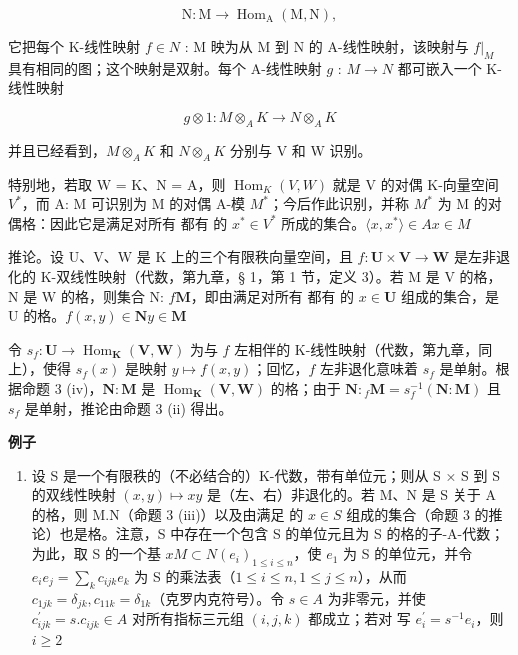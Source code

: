 \[
\mathrm{N}: \mathrm{M} \rightarrow \operatorname{Hom} _ {\mathrm{A}} (\mathrm{M}, \mathrm{N}),
\]

它把每个 K-线性映射 \(f \in N\) : M 映为从 M 到 N 的 A-线性映射，该映射与 \(f|_{M}\) 具有相同的图；这个映射是双射。每个 A-线性映射 \(g\) : \(M \to N\) 都可嵌入一个 K-线性映射

\[
g \otimes 1: M \otimes_ {A} K \rightarrow N \otimes_ {A} K
\]

并且已经看到，\(M \otimes_{A} K\) 和 \(N \otimes_{A} K\) 分别与 V 和 W 识别。

特别地，若取 W = K、N = A，则 \(\operatorname{Hom}_{K}(V, W)\) 就是 V 的对偶 K-向量空间 \(V^{*}\)，而 A: M 可识别为 M 的对偶 A-模 \(M^{*}\)；今后作此识别，并称 \(M^{*}\) 为 M 的对偶格：因此它是满足对所有  都有  的 \(x^{*} \in V^{*}\) 所成的集合。\(\langle x, x^{*} \rangle \in A\)\(x \in M\)

推论。设 U、V、W 是 K 上的三个有限秩向量空间，且 \(f: \mathbf{U} \times \mathbf{V} \to \mathbf{W}\) 是左非退化的 K-双线性映射（代数，第九章，§ 1，第 1 节，定义 3）。若 M 是 V 的格，N 是 W 的格，则集合 N: \(f\mathbf{M}\)，即由满足对所有  都有  的 \(x \in \mathbf{U}\) 组成的集合，是 U 的格。\(f(x, y) \in \mathbf{N}\)\(y \in \mathbf{M}\)

令 \(s_f \colon \mathbf{U} \to \operatorname{Hom}_{\mathbf{K}}(\mathbf{V}, \mathbf{W})\) 为与 \(f\) 左相伴的 K-线性映射（代数，第九章，同上），使得 \(s_f(x)\) 是映射 \(y \mapsto f(x, y)\)；回忆，\(f\) 左非退化意味着 \(s_f\) 是单射。根据命题 3 (iv)，\(\mathbf{N} \colon \mathbf{M}\) 是 \(\operatorname{Hom}_{\mathbf{K}}(\mathbf{V}, \mathbf{W})\) 的格；由于 \(\mathbf{N} \colon {}_f \mathbf{M} = s_f^{-1}(\mathbf{N} \colon \mathbf{M})\) 且 \(s_f\) 是单射，推论由命题 3 (ii) 得出。

\textbf{例子}\par

\begin{enumerate}
\def\labelenumi{(\arabic{enumi})}
\setcounter{enumi}{3}
\tightlist
\item
  设 S 是一个有限秩的（不必结合的）K-代数，带有单位元；则从 S × S 到 S 的双线性映射 \((x,y)\mapsto xy\) 是（左、右）非退化的。若 M、N 是 S 关于 A 的格，则 M.N（命题 3 (iii)）以及由满足  的 \(x\in S\) 组成的集合（命题 3 的推论）也是格。注意，S 中存在一个包含 S 的单位元且为 S 的格的子-A-代数；为此，取 S 的一个基 \(xM\subset N\)\((e_{i})_{1\leqslant i\leqslant n}\)，使 \(e_{1}\) 为 S 的单位元，并令 \(e_{i}e_{j}=\sum_{k}c_{ijk}e_{k}\) 为 S 的乘法表（\(1\leqslant i\leqslant n,1\leqslant j\leqslant n\)），从而 \(c_{1jk}=\delta_{jk},c_{11k}=\delta_{1k}\)（克罗内克符号）。令 \(s\in A\) 为非零元，并使 \(c_{ijk}^{\prime}=s.c_{ijk}\in A\) 对所有指标三元组 \((i,j,k)\) 都成立；若对  写 \(e_{i}^{\prime}=s^{-1}e_{i}\)，则\(i\geqslant2\)
\end{enumerate}

